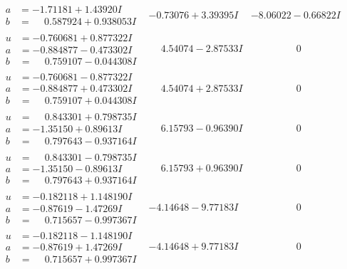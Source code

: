 \documentclass[1p]{elsarticle_modified}
\theoremstyle{definition}
\begin{document}
$$\begin{array}{c|c|c}
\begin{aligned}
a &= -1.71181 + 1.43920 I \\
b &= \phantom{-}0.587924 + 0.938053 I\end{aligned}
 & -0.73076 + 3.39395 I & -8.06022 - 0.66822 I \\ \hline\begin{aligned}
u &= -0.760681 + 0.877322 I \\
a &= -0.884877 - 0.473302 I \\
b &= \phantom{-}0.759107 - 0.044308 I\end{aligned}
 & \phantom{-}4.54074 - 2.87533 I & \phantom{-0.000000 } 0 \\ \hline\begin{aligned}
u &= -0.760681 - 0.877322 I \\
a &= -0.884877 + 0.473302 I \\
b &= \phantom{-}0.759107 + 0.044308 I\end{aligned}
 & \phantom{-}4.54074 + 2.87533 I & \phantom{-0.000000 } 0 \\ \hline\begin{aligned}
u &= \phantom{-}0.843301 + 0.798735 I \\
a &= -1.35150 + 0.89613 I \\
b &= \phantom{-}0.797643 - 0.937164 I\end{aligned}
 & \phantom{-}6.15793 - 0.96390 I & \phantom{-0.000000 } 0 \\ \hline\begin{aligned}
u &= \phantom{-}0.843301 - 0.798735 I \\
a &= -1.35150 - 0.89613 I \\
b &= \phantom{-}0.797643 + 0.937164 I\end{aligned}
 & \phantom{-}6.15793 + 0.96390 I & \phantom{-0.000000 } 0 \\ \hline\begin{aligned}
u &= -0.182118 + 1.148190 I \\
a &= -0.87619 - 1.47269 I \\
b &= \phantom{-}0.715657 - 0.997367 I\end{aligned}
 & -4.14648 - 9.77183 I & \phantom{-0.000000 } 0 \\ \hline\begin{aligned}
u &= -0.182118 - 1.148190 I \\
a &= -0.87619 + 1.47269 I \\
b &= \phantom{-}0.715657 + 0.997367 I\end{aligned}
 & -4.14648 + 9.77183 I & \phantom{-0.000000 } 0 \\ \hline\begin{aligned}

\end{aligned}
\end{array}$$
\end{document}
